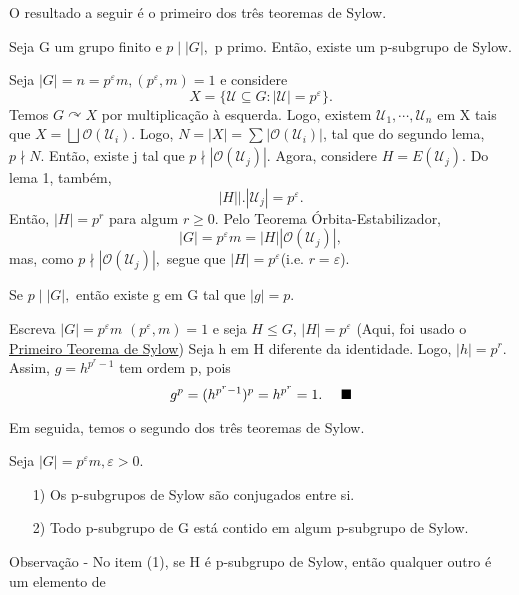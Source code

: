 \documentclass[Algebra/algebra_notes.tex]{subfiles}
\begin{document}
O resultado a seguir é o primeiro dos três teoremas de Sylow.
\hypertarget{sylow_one}{
	\begin{theorem*}
		Seja G um grupo finito e \(p\mid |G|,\) p primo. Então, existe um p-subgrupo de Sylow.
	\end{theorem*}
}
\begin{proof*}
	Seja \(|G| = n = p^{\varepsilon }m, (p^{\varepsilon }, m) = 1\) e considere
	\[
		X = \{\mathcal{U}\subseteq{G}: |\mathcal{U}| = p^{\varepsilon }\}.
	\]
	Temos \(G \curvearrowright X\) por multiplicação à esquerda. Logo, existem
	\(\mathcal{U}_{1}, \cdots, \mathcal{U}_{n}\) em X tais que \(X = \bigsqcup_{}^{}{\mathcal{O}(\mathcal{U}_{i})}\).
	Logo, \(N = |X| = \sum\limits_{}^{}|\mathcal{O}(\mathcal{U}_{i})|\), tal que do segundo lema,
	\(p\nmid N.\) Então, existe j tal que \(p\nmid|\mathcal{O}(\mathcal{U}_{j})|\).
	Agora, considere \(H = E(\mathcal{U}_{j}).\) Do lema 1, também,
	\[
		|H|\biggl|\biggr. |\mathcal{U}_{j}| = p^{\varepsilon }.
	\]
	Então, \(|H| = p^{r}\) para algum \(r\geq 0\). Pelo Teorema Órbita-Estabilizador,
	\[
		|G| = p^{\varepsilon }m = |H||\mathcal{O}(\mathcal{U}_{j})|,
	\]
	mas, como \(p\nmid|\mathcal{O}(\mathcal{U}_{j})|,\) segue que \(|H| = p^{\varepsilon }\)(i.e. \(r=\varepsilon \)). \qedsymbol
\end{proof*}
\begin{crl*}
	Se \(p\mid |G|,\) então existe g em G tal que \(|g| = p.\)
\end{crl*}
\begin{proof*}
	Escreva \(|G| = p^{\varepsilon }m\) \((p^{\varepsilon }, m) = 1\) e seja \(H\leq G\),
	\(|H| = p^{\varepsilon }\) (Aqui, foi usado o \hyperlink{sylow_one}{Primeiro Teorema de Sylow})
	Seja h em H diferente da identidade. Logo, \(|h| = p^{r}.\) Assim, \(g = h^{p^{r}-1}\)
	tem ordem p, pois
	\[
		g^{p} = (h^{p^{r}-1})^{p} = h^{p^{r}} = 1.\quad\text{ $\blacksquare$}
	\]
\end{proof*}
Em seguida, temos o segundo dos três teoremas de Sylow.
\hypertarget{sylow_two}{
	\begin{theorem*}
		Seja \(|G| = p^{\varepsilon }m, \varepsilon >0\).
		\begin{itemize}
			\item[1)] Os p-subgrupos de Sylow são conjugados entre si.
			\item[2)] Todo p-subgrupo de G está contido em algum p-subgrupo de Sylow.
		\end{itemize}
	\end{theorem*}}
Observação - No item (1), se H é p-subgrupo de Sylow, então qualquer outro é um elemento de
\end{document}
